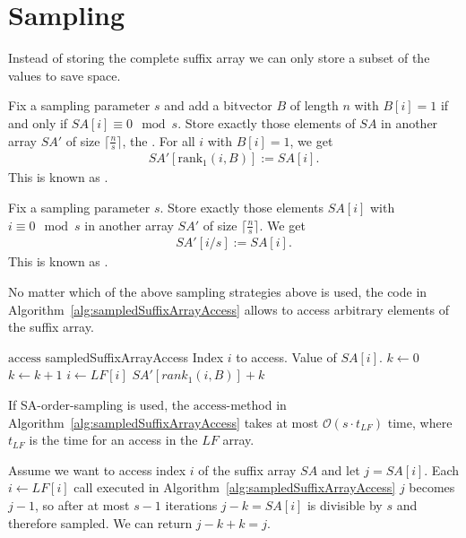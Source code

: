 \section{Sampling}

Instead of storing the complete suffix array we can only store a subset of the values to save space.

\begin{Definition}
  Fix a sampling parameter $s$ and add a bitvector $B$ of length $n$ with $B[i] = 1$ if and only if $SA[i] \equiv 0 \mod s$. Store exactly those elements of $SA$ in another array $SA'$ of size $\lceil \frac{n}{s} \rceil$, the . For all $i$ with $B[i] = 1$, we get
  \begin{align}
    SA'[\mathrm{rank}_1(i, B)] := SA[i]
    \text{.}
  \end{align}
  This is known as .
\end{Definition}

\begin{Definition}
  Fix a sampling parameter $s$. Store exactly those elements $SA[i]$ with $i \equiv 0 \mod s$ in another array $SA'$ of size $\lceil \frac{n}{s} \rceil$. We get
  \begin{align}
    SA'[i/s] := SA[i]
    \text{.}
  \end{align}
  This is known as .
\end{Definition}

No matter which of the above sampling strategies above is used, the code in Algorithm~\ref{alg:sampledSuffixArrayAccess} allows to access arbitrary elements of the suffix array.

\begin{pseudocode}
  {$\mathrm{access}$}
  {sampledSuffixArrayAccess}
  {Index $i$ to access.}
  {Value of $SA[i]$.}
  \STATE $k \gets 0$
    \STATE $k \gets k + 1$
    \STATE $i \gets LF[i]$
  \ENDWHILE
  \RETURN $SA'[rank_1(i, B)] + k$
\end{pseudocode}

\begin{Theorem}
  If SA-order-sampling is used, the $\mathrm{access}$-method in Algorithm~\ref{alg:sampledSuffixArrayAccess} takes at most $\mathcal{O}(s\cdot t_{LF})$ time, where $t_{LF}$ is the time for an access in the $LF$ array.
\end{Theorem}

\begin{Proof}
  Assume we want to access index $i$ of the suffix array $SA$ and let $j = SA[i]$. Each $i \leftarrow LF[i]$ call executed in Algorithm~\ref{alg:sampledSuffixArrayAccess} $j$ becomes $j-1$, so after at most $s - 1$ iterations $j - k = SA[i]$ is divisible by $s$ and therefore sampled. We can return $j - k + k = j$.
\end{Proof}

